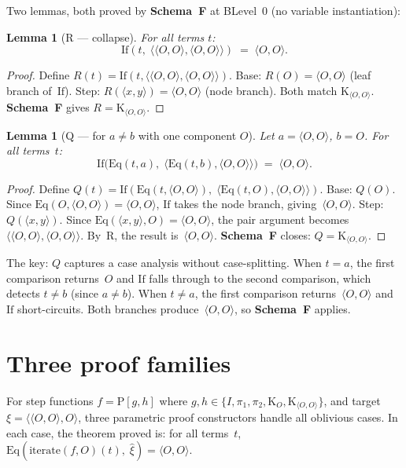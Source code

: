 \documentclass[11pt]{article}
\newtheorem{lemma}[theorem]{Lemma}
\newcommand{\pair}[2]{\langle #1, #2 \rangle}
\newcommand{\pmark}{\pair{O}{O}}   %
\newcommand{\SchemaF}{\textbf{Schema~F}}
\begin{document}
Two lemmas, both proved by \SchemaF{} at BLevel~$0$
(no variable instantiation):

\begin{lemma}[R --- collapse]
  For all terms $t$:
  \[
    \mathrm{If}(t,\; \pair{\pmark}{\pmark}) \;=\; \pmark.
  \]
\end{lemma}
\begin{proof}
  Define $R(t) = \mathrm{If}(t, \pair{\pmark}{\pmark})$.
  Base: $R(O) = \pmark$ (leaf branch of~$\mathrm{If}$).
  Step: $R(\pair{x}{y}) = \pmark$ (node branch).
  Both match $\mathrm{K}_{\pmark}$.
  \SchemaF{} gives $R = \mathrm{K}_{\pmark}$.
\end{proof}

\begin{lemma}[Q --- for $a \ne b$ with one component $O$]
  Let $a = \pmark$, $b = O$.  For all terms~$t$:
  \[
    \mathrm{If}\!\bigl(\mathrm{Eq}(t, a),\;
      \pair{\mathrm{Eq}(t, b)}{\pmark}\bigr) \;=\; \pmark.
  \]
\end{lemma}
\begin{proof}
  Define $Q(t) = \mathrm{If}(\mathrm{Eq}(t, \pmark),\;
    \pair{\mathrm{Eq}(t, O)}{\pmark})$.
  Base: $Q(O)$. Since $\mathrm{Eq}(O, \pmark) = \pmark$,
  $\mathrm{If}$ takes the node branch, giving~$\pmark$.
  Step: $Q(\pair{x}{y})$. Since $\mathrm{Eq}(\pair{x}{y}, O) = \pmark$,
  the pair argument becomes $\pair{\pmark}{\pmark}$.
  By~R, the result is~$\pmark$.
  \SchemaF{} closes: $Q = \mathrm{K}_{\pmark}$.
\end{proof}

The key: $Q$ captures a case analysis without case-splitting.
When $t = a$, the first comparison returns~$O$ and
$\mathrm{If}$ falls through to the second comparison, which detects
$t \ne b$ (since $a \ne b$).  When $t \ne a$, the first comparison
returns~$\pmark$ and $\mathrm{If}$ short-circuits.
Both branches produce~$\pmark$, so \SchemaF{} applies.

\section{Three proof families}

For step functions $f = \mathrm{P}[g, h]$ where
$g, h \in \{I, \pi_1, \pi_2, \mathrm{K}_O, \mathrm{K}_{\pmark}\}$,
and target $\xi = \pair{\pmark}{O}$,
three parametric proof constructors handle all oblivious cases.
In each case, the theorem proved is:
for all terms~$t$,
$\mathrm{Eq}(\mathrm{iterate}(f, O)(t),\; \hat\xi) = \pmark$.
\end{document}
